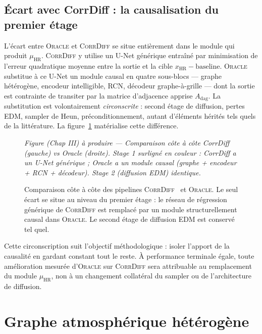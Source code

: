 \documentclass[14pt,a4paper,openany]{extreport}
\theoremstyle{definition}
\newcommand{\Oracle}{\textsc{Oracle}}
\newcommand{\CorrDiff}{\textsc{CorrDiff}}
\newcommand{\HR}{\ensuremath{\text{HR}}}
\newcommand{\xHR}{\ensuremath{x_{\HR}}}
\newcommand{\muHR}{\ensuremath{\mu_{\HR}}}
\newcommand{\Adag}{\ensuremath{A_{\mathrm{dag}}}}
\newcommand{\figplaceholder}[2][0.9\linewidth]{%
  \begin{tcolorbox}[width=#1,height=5cm,valign=center,colback=gray!8,colframe=gray!45,arc=2pt,boxrule=0.5pt]
    \centering\small\textit{#2}
  \end{tcolorbox}%
}
\begin{document}
\subsection{Écart avec CorrDiff : la causalisation du premier étage}
\label{ssec:oracle-diff-corrdiff}

L'écart entre \Oracle{} et \CorrDiff{} se situe entièrement dans le module qui produit $\muHR$. \CorrDiff{} y utilise un U-Net générique entraîné par minimisation de l'erreur quadratique moyenne entre la sortie et la cible $\xHR - \mathrm{baseline}$. \Oracle{} substitue à ce U-Net un module causal en quatre sous-blocs --- graphe hétérogène, encodeur intelligible, RCN, décodeur graphe-à-grille --- dont la sortie est contrainte de transiter par la matrice d'adjacence apprise $\Adag$. La substitution est volontairement \emph{circonscrite} : second étage de diffusion, pertes EDM, sampler de Heun, préconditionnement, autant d'éléments hérités tels quels de la littérature. La figure~\ref{fig:oracle-vs-corrdiff} matérialise cette différence.

\begin{figure}[ht]
  \centering
  \figplaceholder{Figure (Chap III) à produire --- Comparaison côte à côte CorrDiff (gauche) vs Oracle (droite). Stage 1 surligné en couleur : CorrDiff a un U-Net générique ; Oracle a un module causal (graphe + encodeur + RCN + décodeur). Stage 2 (diffusion EDM) identique.}
  \caption{Comparaison côte à côte des pipelines \CorrDiff{}~\cite{mardani_corrdiff_2023} et \Oracle{}. Le seul écart se situe au niveau du premier étage : le réseau de régression générique de \CorrDiff{} est remplacé par un module structurellement causal dans \Oracle{}. Le second étage de diffusion EDM est conservé tel quel.}
  \label{fig:oracle-vs-corrdiff}
\end{figure}

Cette circonscription suit l'objectif méthodologique : isoler l'apport de la causalité en gardant constant tout le reste. À performance terminale égale, toute amélioration mesurée d'\Oracle{} sur \CorrDiff{} sera attribuable au remplacement du module $\muHR$, non à un changement collatéral du sampler ou de l'architecture de diffusion.

\section{Graphe atmosphérique hétérogène}
\label{sec:oracle-graphe}
\end{document}
